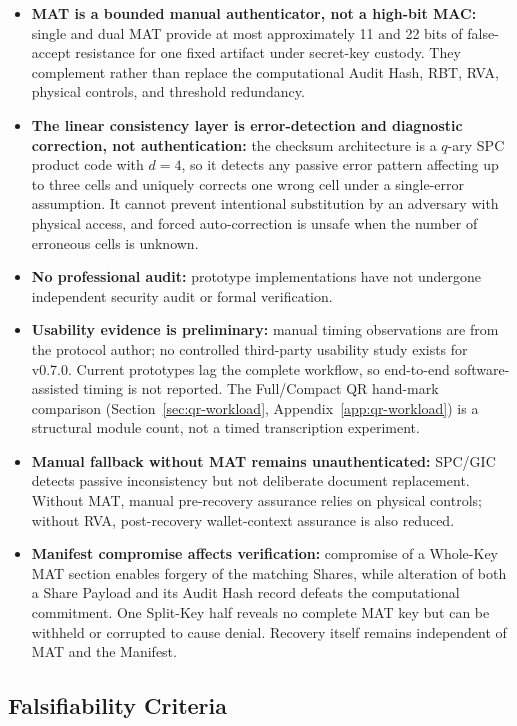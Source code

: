 \documentclass[11pt]{article}
\begin{document}
\begin{itemize}[noitemsep]
    \item \textbf{MAT is a bounded manual authenticator, not a high-bit MAC:} single and dual MAT provide at most approximately 11 and 22 bits of false-accept resistance for one fixed artifact under secret-key custody. They complement rather than replace the computational Audit Hash, RBT, RVA, physical controls, and threshold redundancy.
    \item \textbf{The linear consistency layer is error-detection and diagnostic correction, not authentication:} the checksum architecture is a $q$-ary SPC product code with $d = 4$, so it detects any passive error pattern affecting up to three cells and uniquely corrects one wrong cell under a single-error assumption. It cannot prevent intentional substitution by an adversary with physical access, and forced auto-correction is unsafe when the number of erroneous cells is unknown.
    \item \textbf{No professional audit:} prototype implementations have not undergone independent security audit or formal verification.
    \item \textbf{Usability evidence is preliminary:} manual timing observations are from the protocol author; no controlled third-party usability study exists for v0.7.0. Current prototypes lag the complete workflow, so end-to-end software-assisted timing is not reported. The Full/Compact QR hand-mark comparison (Section~\ref{sec:qr-workload}, Appendix~\ref{app:qr-workload}) is a structural module count, not a timed transcription experiment.
    \item \textbf{Manual fallback without MAT remains unauthenticated:} SPC/GIC detects passive inconsistency but not deliberate document replacement. Without MAT, manual pre-recovery assurance relies on physical controls; without RVA, post-recovery wallet-context assurance is also reduced.
    \item \textbf{Manifest compromise affects verification:} compromise of a Whole-Key MAT section enables forgery of the matching Shares, while alteration of both a Share Payload and its Audit Hash record defeats the computational commitment. One Split-Key half reveals no complete MAT key but can be withheld or corrupted to cause denial. Recovery itself remains independent of MAT and the Manifest.
\end{itemize}

\subsection{Falsifiability Criteria}
\end{document}
